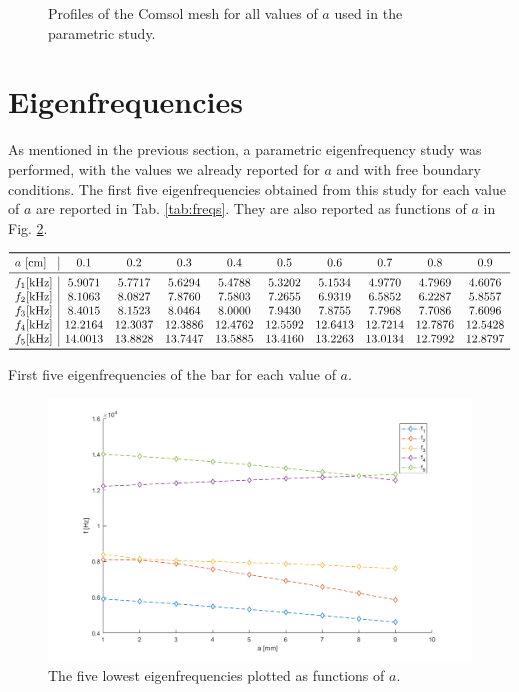 \documentclass[a4paper]{article}
\begin{document}
\begin{figure}[h]
\begin{subfigure}{0.22\linewidth}
	\end{subfigure}
	\caption{Profiles of the Comsol mesh for all values of $a$ used in the parametric study.}
	\label{fig:mesh}
\end{figure}

\section{Eigenfrequencies}
As mentioned in the previous section, a parametric eigenfrequency study was performed, with the values we already reported for $a$ and with free boundary conditions. The first five eigenfrequencies obtained from this study for each value of $a$ are reported in Tab. \ref{tab:freqs}. They are also reported as functions of $a$ in Fig. \ref{fig:freqz}.

\begin{table}[h]
	\centering
	$\begin{array}{l|ccccccccc}
		\toprule
		 a~[\si{\centi\meter}] & 0.1 & 0.2 & 0.3 & 0.4 & 0.5 & 0.6 & 0.7 & 0.8 & 0.9\\
		 \midrule
		 f_1[\si{\kilo\hertz}]&5.9071  &  5.7717  &  5.6294  &  5.4788   & 5.3202 &   5.1534  &  4.9770  &  4.7969   & 4.6076\\
		 f_2[\si{\kilo\hertz}]&8.1063   & 8.0827 &   7.8760  &  7.5803  &  7.2655 &   6.9319  &  6.5852  &  6.2287 &   5.8557\\
		 f_3[\si{\kilo\hertz}]&8.4015  &  8.1523  &  8.0464  &  8.0000  &  7.9430 &   7.8755 &   7.7968  &  7.7086 &   7.6096\\
		 f_4[\si{\kilo\hertz}]&12.2164 &  12.3037 &  12.3886  & 12.4762 &  12.5592 &  12.6413 &  12.7214  & 12.7876 &   12.5428\\
		 f_5[\si{\kilo\hertz}]&14.0013  & 13.8828 &  13.7447  & 13.5885  & 13.4160&   13.2263 &  13.0134 &  12.7992 &  12.8797\\
		 \bottomrule
	\end{array}$
	\caption{First five eigenfrequencies of the bar for each value of $a$.}
	\label{tab:freqs}
\end{table}

\begin{figure}[h]
	\centering
	\includegraphics[width=0.85\linewidth]{freqz.png}
	\caption{The five lowest eigenfrequencies plotted as functions of $a$.}
	\label{fig:freqz}
\end{figure}
\end{document}
